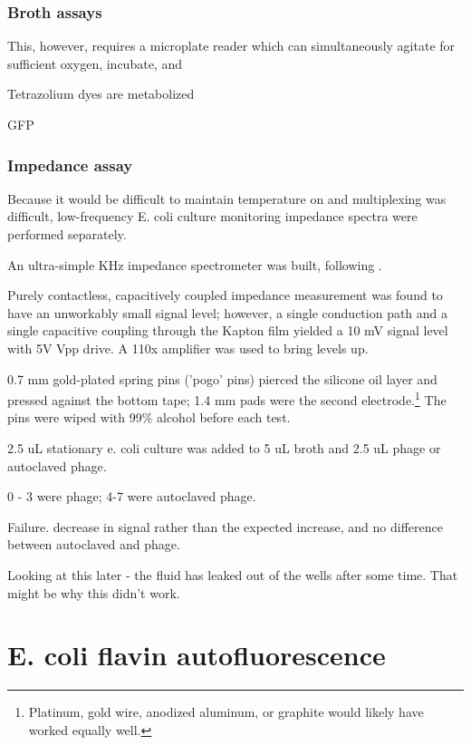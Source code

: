 \documentclass[paper.tex]{subfiles}
\begin{document}
\subsubsection{Broth assays}

This, however, requires a microplate reader which can simultaneously agitate for sufficient oxygen, incubate, and 

Tetrazolium dyes are metabolized 

GFP


\subsubsection{Impedance assay}


Because it would be difficult to maintain temperature on and multiplexing was difficult, low-frequency E. coli culture monitoring impedance spectra were performed separately.

An ultra-simple KHz impedance spectrometer was built, following \cite{unconventional2015}.

Purely contactless, capacitively coupled impedance measurement was found to have an unworkably small signal level;
however, a single conduction path and a single capacitive coupling through the Kapton film yielded a 10 mV signal level with 5V Vpp drive. A 110x amplifier was used to bring levels up.

0.7 mm gold-plated spring pins ('pogo' pins) pierced the silicone oil layer and pressed against the bottom tape; 1.4 mm pads were the second electrode.\footnote{Platinum, gold wire, anodized aluminum, or graphite would likely have worked equally well.} The pins were wiped with 99\% alcohol before each test.

2.5 uL stationary e. coli culture was added to 5 uL broth and 2.5 uL phage or autoclaved phage.

0 - 3 were phage; 4-7 were autoclaved phage.

Failure. decrease in signal rather than the expected increase, and no difference between autoclaved and phage.

Looking at this later - the fluid has leaked out of the wells after some time. That might be why this didn't work.



\section{E. coli flavin autofluorescence}
\end{document}
